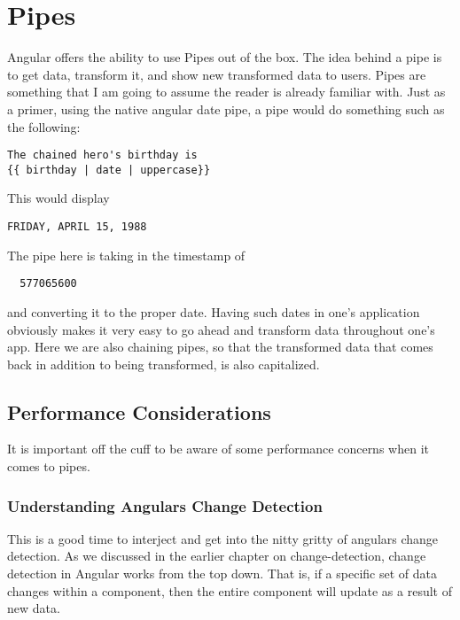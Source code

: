 \section{ Pipes }
\maketitle{}

Angular offers the ability to use Pipes out of the box. The idea behind a pipe
is to get data, transform it, and show new transformed data to users. Pipes are
something that I am going to assume the reader is already familiar with. Just as
a primer, using the native angular date pipe, a pipe would do something such
as the following:
\begin{lstlisting}
The chained hero's birthday is
{{ birthday | date | uppercase}}
\end{lstlisting}

This would display
\begin{verbatim}
FRIDAY, APRIL 15, 1988
\end{verbatim}

The pipe here is taking in the timestamp of
\begin{verbatim}
  577065600
\end{verbatim}
and converting it to the proper date. Having such dates in one's application
obviously makes it very easy to go ahead and transform data throughout one's
app. Here we are also chaining pipes, so that the transformed data that comes
back in addition to being transformed, is also capitalized.

\subsection{ Performance Considerations }
It is important off the cuff to be aware of some performance concerns when it
comes to pipes.

\subsubsection{ Understanding Angulars Change Detection }
This is a good time to interject and get into the nitty gritty of angulars
change detection. As we discussed in the earlier chapter on change-detection,
change detection in Angular works from the top down. That is, if a specific set
of data changes within a component, then the entire component will update as a
result of new data.  
